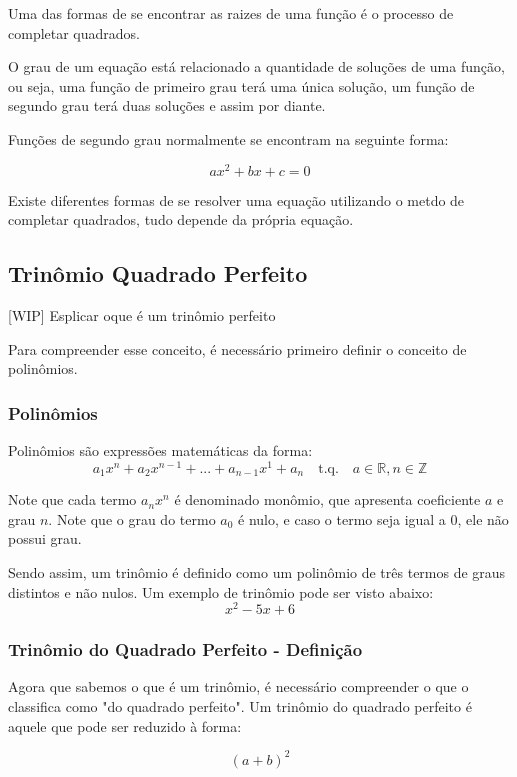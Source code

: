 \documentclass[../resumo.tex]{subfiles}
\begin{document}
	Uma das formas de se encontrar as raizes de uma função é o processo de completar quadrados.

	O grau de um equação está relacionado a quantidade de soluções de uma função, ou seja, uma função
	de primeiro grau terá uma única solução, um função de segundo grau terá duas soluções e assim por diante.

	Funções de segundo grau normalmente se encontram na seguinte forma:

	\[ ax^2 + bx + c = 0 \]

	Existe diferentes formas de se resolver uma equação utilizando o metdo de completar quadrados, tudo depende 
	da própria equação.

	\subsection{Trinômio Quadrado Perfeito}

	[WIP] Esplicar oque é um trinômio perfeito

	Para compreender esse conceito, é necessário primeiro definir o conceito de polinômios.

	\subsubsection{Polinômios}

	Polinômios são expressões matemáticas da forma:
	\[a_1x^n + a_2x^{n-1} + ... + a_{n-1}x^1 + a_n \quad \textrm{t.q.} \quad a \in \mathbb{R}, n \in \mathbb{Z}\]

	Note que cada termo \(a_nx^n\) é denominado monômio, que apresenta coeficiente \(a\) e grau \(n\).
	Note que o grau do termo \(a_0\) é nulo, e caso o termo seja igual a 0, ele não possui grau.

	Sendo assim, um trinômio é definido como um polinômio de três termos de graus distintos e não nulos. Um exemplo de
	trinômio pode ser visto abaixo:
	\[x^2 - 5x + 6\]

	\subsubsection{Trinômio do Quadrado Perfeito - Definição}

	Agora que sabemos o que é um trinômio, é necessário compreender o que o classifica como "do 
	quadrado perfeito". Um trinômio do quadrado perfeito é aquele que pode ser reduzido à forma:

	\[(a + b)^2\]
\end{document}
